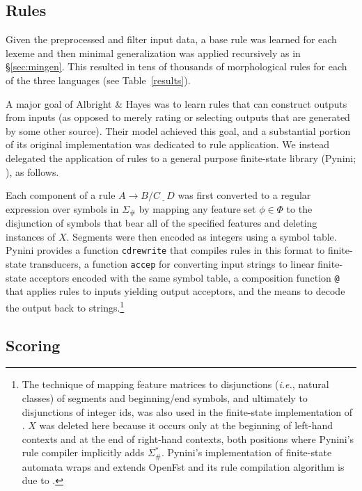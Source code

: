 \documentclass[11pt]{article}
\begin{document}
\subsection{Rules}

Given the preprocessed and filter input data, a base rule was learned for each lexeme and then minimal generalization was applied recursively as in \S\ref{sec:mingen}. This resulted in tens of thousands of morphological rules for each of the three languages (see Table~\ref{results}).

A major goal of Albright \& Hayes was to learn rules that can construct outputs from inputs (as opposed to merely rating or selecting outputs that are generated by some other source). Their model achieved this goal, and a substantial portion of its original implementation was dedicated to rule application. We instead delegated the application of rules to a general purpose finite-state library (Pynini; \citealp{gorman-2016-pynini, gorman2021}), as follows.

Each component of a rule $A \to B / C \underline{\ \ \ } D$ was first converted to a regular expression over symbols in $\Sigma_{\#}$ by mapping any feature set $\phi \in \Phi$ to the disjunction of symbols that bear all of the specified features and deleting instances of $X$. Segments were then encoded as integers using a symbol table. Pynini provides a function \texttt{cdrewrite} that compiles rules in this format to finite-state transducers, a function \texttt{accep} for converting input strings to linear finite-state acceptors encoded with the same symbol table, a composition function \texttt{@} that applies rules to inputs yielding output acceptors, and the means to decode the output back to strings.\footnote{The technique of mapping feature matrices to disjunctions (\emph{i.e.}, natural classes) of segments and beginning/end symbols, and ultimately to disjunctions of integer ids, was also used in the finite-state implementation of \citet{hayes2008}. $X$ was deleted here because it occurs only at the beginning of left-hand contexts and at the end of right-hand contexts, both positions where Pynini's rule compiler implicitly adds $\Sigma_{\#}^*$. Pynini's implementation of finite-state automata wraps and extends OpenFst \citep{riley-etal-2009-openfst} and its rule compilation algorithm is due to \citet{mohri-sproat-1996-efficient}.}

\subsection{Scoring}
\end{document}
